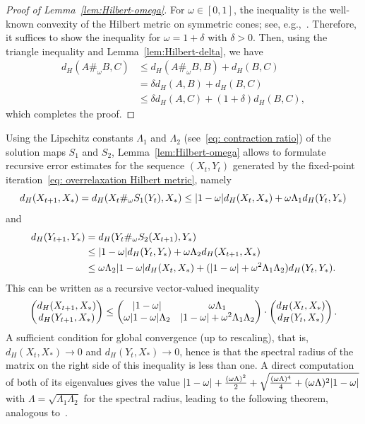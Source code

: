 \documentclass[a4paper]{article}
\DeclarePairedDelimiter{\abs}{\lvert}{\rvert}
\theoremstyle{definition}
\numberwithin{equation}{section}
\begin{document}
\begin{proof}[Proof of Lemma~\ref{lem:Hilbert-omega}]
For $\omega \in [0,1]$, the inequality is the well-known convexity of the Hilbert metric on symmetric cones; see, e.g.,~\cite[Corollary 1.1]{Gunawardena2003}. Therefore, it suffices to show the inequality for $\omega = 1 + \delta$ with $\delta > 0$. Then, using the triangle inequality and Lemma~\ref{lem:Hilbert-delta}, we have
\begin{align*}
 d_H(A \#_{\omega} B, C) %
 &\leq d_H(A \#_{\omega} B, B) + d_H(B, C) \\
 &= \delta d_H(A, B) + d_H(B, C) \\
 &\le \delta d_H(A, C) + (1+\delta) d_H(B, C),
\end{align*}
which completes the proof.
\end{proof}

Using the Lipschitz constants $\Lambda_1$ and $\Lambda_2$ (see~\eqref{eq: contraction ratio}) of the solution maps $S_1$ and $S_2$, Lemma~\ref{lem:Hilbert-omega} allows to formulate recursive error estimates for the sequence $(X_t,Y_t)$ generated by the fixed-point iteration~\eqref{eq: overrelaxation Hilbert metric}, namely
\[
 d_H(X_{t+1}, X_*) = d_H(X_t \#_\omega S_1(Y_t), X_*) \le \abs{1-\omega} d_H(X_t,X_*) + \omega \Lambda_1 d_H(Y_t,Y_*)
\]
and
\begin{align*}
 d_H(Y_{t+1}, Y_*) 
 &= d_H(Y_t \#_\omega S_2(X_{t+1}), Y_*) \\
 &\le \abs{1-\omega} d_H(Y_t,Y_*) + \omega \Lambda_2 d_H(X_{t+1},X_*) \\
 &\le \omega \Lambda_2 \abs{1-\omega} d_H(X_t,X_*) + (\abs{1-\omega} + \omega^2 \Lambda_1 \Lambda_2) d_H(Y_t,Y_*).
\end{align*}
This can be written as a recursive vector-valued inequality
\[
\begin{pmatrix}
    d_H(X_{t+1}, X_*) \\
    d_H(Y_{t+1}, X_*)
\end{pmatrix}
\le
\begin{pmatrix}
    \abs{1-\omega} & \omega \Lambda_1 \\ 
    \omega \abs{1-\omega} \Lambda_2 & \abs{1-\omega} + \omega^2 \Lambda_1 \Lambda_2
\end{pmatrix}
\cdot
\begin{pmatrix}
    d_H(X_{t}, X_*) \\
    d_H(Y_{t}, X_*)
\end{pmatrix}.
\]
A sufficient condition for global convergence (up to rescaling), that is, $d_H(X_t, X_*) \to 0$ and $d_H(Y_t, X_*) \to 0$, hence is that the spectral radius of the matrix on the right side of this inequality is less than one. A direct computation of both of its eigenvalues gives the value $\abs{1-\omega} + \frac{(\omega \Lambda)^2}{2} + \sqrt{\frac{(\omega \Lambda)^4}{4} + (\omega \Lambda)^2 \abs{1-\omega}}$ with $\Lambda = \sqrt{\Lambda_1 \Lambda_2}$ for the spectral radius, leading to the following theorem, analogous to~\cite[Theorem~3]{Lehmann2022}.
\end{document}
